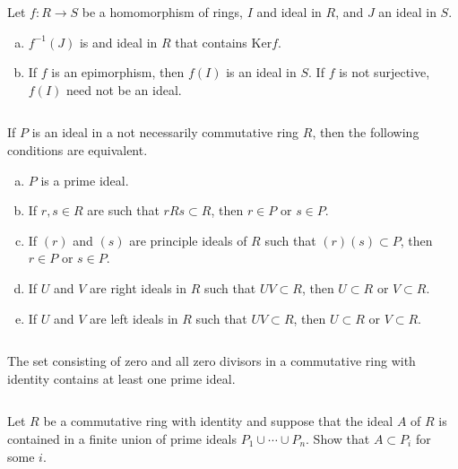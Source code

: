 $$ $$

\begin{ex}
    Let $f:R\to S$ be a homomorphism of rings, $I$ and ideal in $R$, and $J$ an ideal in $S$.
    \begin{enumerate}[(a)]
        \item $f^{-1}(J)$ is and ideal in $R$ that contains $\mathrm{Ker}f$.
        \item If $f$ is an epimorphism, then $f(I)$ is an ideal in $S$. If $f$ is not surjective, $f(I)$ need not be an ideal.
    \end{enumerate}
\end{ex}

$$ $$

\begin{ex}
    If $P$ is an ideal in a not necessarily commutative ring $R$, then the following conditions are equivalent.
    \begin{enumerate}[(a)]
        \item $P$ is a prime ideal.
        \item If $r,s\in R$ are such that $rRs\subset R$, then $r\in P$ or $s\in P$.
        \item If $(r)$ and $(s)$ are principle ideals of $R$ such that $(r)(s)\subset P$, then $r\in P$ or $s\in P$.
        \item If $U$ and $V$ are right ideals in $R$ such that $UV\subset R$, then $U\subset R$ or $V\subset R$.
        \item If $U$ and $V$ are left ideals in $R$ such that $UV\subset R$, then $U\subset R$ or $V\subset R$.
    \end{enumerate}
\end{ex}

$$ $$

\begin{ex}
    The set consisting of zero and all zero divisors in a commutative ring with identity contains at least one prime ideal.
\end{ex}

$$ $$

\begin{ex}
    Let $R$ be a commutative ring with identity and suppose that the ideal $A$ of $R$ is contained in a finite union of prime ideals $P_{1}\cup\cdots\cup P_{n}$. Show that $A\subset P_{i}$ for some $i$.
\end{ex}

$$ $$

